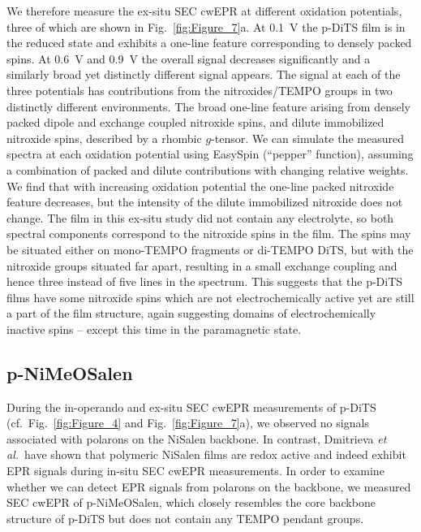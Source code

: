 \par
We therefore measure the ex-situ SEC cwEPR at different oxidation potentials, three of which are shown in Fig.~\ref{fig:Figure_7}a. At 0.1~V the p-DiTS film is in the reduced state and exhibits a one-line feature corresponding to densely packed spins. At 0.6~V and 0.9~V the overall signal decreases significantly and a similarly broad yet distinctly different signal appears. The signal at each of the three potentials has contributions from the nitroxides/TEMPO groups in two distinctly different environments. The broad one-line feature arising from densely packed dipole and exchange coupled nitroxide spins, and dilute immobilized nitroxide spins, described by a rhombic $g$-tensor. We can simulate the measured spectra at each oxidation potential using EasySpin \cite{Stoll2006} (``pepper'' function), assuming a combination of packed and dilute contributions with changing relative weights. We find that with increasing oxidation potential the one-line packed nitroxide feature decreases, but the intensity of the dilute immobilized nitroxide does not change. The film in this ex-situ study did not contain any electrolyte, so both spectral components correspond to the nitroxide spins in the film. The spins may be situated either on mono-TEMPO fragments or di-TEMPO DiTS, but with the nitroxide groups situated far apart, resulting in a small exchange coupling and hence three instead of five lines in the spectrum. This suggests that the p-DiTS films have some nitroxide spins which are not electrochemically active yet are still a part of the film structure, again suggesting domains of electrochemically inactive spins -- except this time in the paramagnetic state.

\subsection{p-NiMeOSalen} \label{Section:ex-situ_pNiMeOS}
%
During the in-operando and ex-situ SEC cwEPR measurements of p-DiTS (cf.\ Fig.~\ref{fig:Figure_4} and Fig.~\ref{fig:Figure_7}a), we observed no signals associated with polarons on the NiSalen backbone. In contrast, Dmitrieva \textit{et al.}\ have shown that polymeric NiSalen films are redox active and indeed exhibit EPR signals during in-situ SEC cwEPR measurements.\cite{Dmitrieva2018} In order to examine whether we can detect EPR signals from polarons on the backbone, we measured SEC cwEPR of p-NiMeOSalen, which closely resembles the core backbone structure of p-DiTS but does not contain any TEMPO pendant groups.
\par

